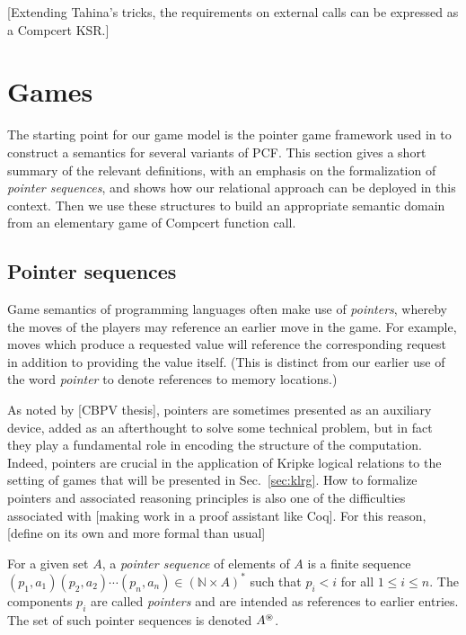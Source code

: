 \documentclass[sigplan,10pt,review,anonymous]{acmart}
\begin{document}
[Extending Tahina's tricks,
the requirements on
external calls
can be expressed as a Compcert KSR.]



\section{Games} %
\label{sec:games}

The starting point for our game model
is the pointer game framework used in \citep{gamesem99}
to construct a semantics for several variants of PCF.
This section gives a short summary of the relevant definitions,
with an emphasis on the formalization of \emph{pointer sequences},
and shows how our relational approach can be deployed in this context.
Then we use these structures
to build an appropriate semantic domain
from an elementary game of Compcert function call.

\subsection{Pointer sequences} %

Game semantics of programming languages
often make use of \emph{pointers},
whereby the moves of the players
may reference an earlier move in the game.
For example,
moves which produce a requested value
will reference the corresponding request
in addition to providing the value itself.
(This is distinct from
our earlier use of the word \emph{pointer}
to denote references to memory locations.)

As noted by [CBPV thesis],
pointers are sometimes presented as an auxiliary device,
added as an afterthought to solve some technical problem,
but in fact they play a fundamental role
in encoding the structure of the computation.
Indeed,
pointers are crucial in the
application of Kripke logical relations
to the setting of games
that will be presented in Sec.~\ref{sec:klrg}.
How to formalize pointers and associated reasoning principles
is also one of the difficulties associated with
[making work in a proof assistant like Coq].
For this reason,
[define on its own and more formal than usual]

\begin{definition}
For a given set $A$,
a \emph{pointer sequence} of elements of $A$
is a finite sequence
$(p_1, a_1) (p_2, a_2) \cdots (p_n, a_n) \in (\mathbb{N} \times A)^*$
such that $p_i < i$ for all $1 \le i \le n$.
The components $p_i$ are called \emph{pointers}
and are intended as references to earlier entries.
The set of such pointer sequences is denoted $A^\oast$.
\end{definition}
\end{document}
